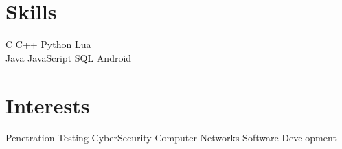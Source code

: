 \documentclass[]{deedy-resume-openfont}
\begin{document}
\begin{minipage}[t]{0.33\textwidth}
\section{Skills}
C \textbullet{}   C++ \textbullet{} Python \textbullet{} Lua \\
Java \textbullet{} JavaScript \textbullet{} SQL \textbullet{} Android \\ 
\section{Interests}
Penetration Testing \textbullet{} CyberSecurity \textbullet{} Computer Networks \textbullet{} Software Development
\sectionsep

%
%

\end{minipage} 
\hfill
\end{document}

